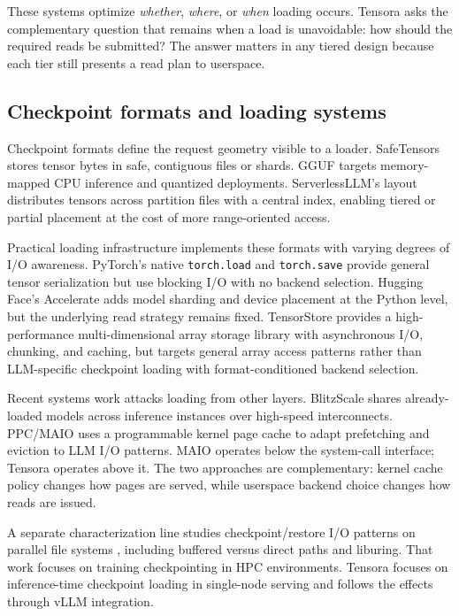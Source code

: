 These systems optimize \emph{whether}, \emph{where}, or \emph{when} loading occurs. Tensora asks the complementary question that remains when a load is unavoidable: how should the required reads be submitted? The answer matters in any tiered design because each tier still presents a read plan to userspace.

\subsection{Checkpoint formats and loading systems}

Checkpoint formats define the request geometry visible to a loader. SafeTensors \cite{safetensors_docs} stores tensor bytes in safe, contiguous files or shards. GGUF targets memory-mapped CPU inference and quantized deployments. ServerlessLLM's layout \cite{serverlessllm_repo} distributes tensors across partition files with a central index, enabling tiered or partial placement at the cost of more range-oriented access.

Practical loading infrastructure implements these formats with varying degrees of I/O awareness. PyTorch's native \texttt{torch.load} and \texttt{torch.save} provide general tensor serialization but use blocking I/O with no backend selection. Hugging Face's Accelerate \cite{accelerate_docs} adds model sharding and device placement at the Python level, but the underlying read strategy remains fixed. TensorStore \cite{tensorstore_docs} provides a high-performance multi-dimensional array storage library with asynchronous I/O, chunking, and caching, but targets general array access patterns rather than LLM-specific checkpoint loading with format-conditioned backend selection.

Recent systems work attacks loading from other layers. BlitzScale \cite{blitzscale} shares already-loaded models across inference instances over high-speed interconnects. PPC/MAIO \cite{fast26_maio} uses a programmable kernel page cache to adapt prefetching and eviction to LLM I/O patterns. MAIO operates below the system-call interface; Tensora operates above it. The two approaches are complementary: kernel cache policy changes how pages are served, while userspace backend choice changes how reads are issued.

A separate characterization line studies checkpoint/restore I/O patterns on parallel file systems \cite{arxiv2512_checkpoint_io}, including buffered versus direct paths and liburing. That work focuses on training checkpointing in HPC environments. Tensora focuses on inference-time checkpoint loading in single-node serving and follows the effects through vLLM integration.

